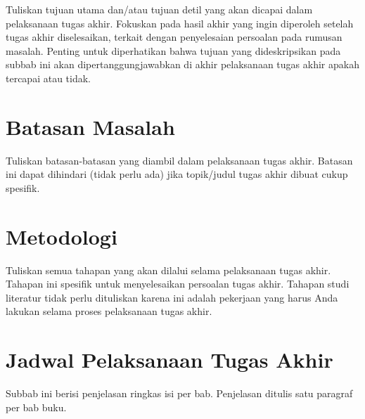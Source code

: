 Tuliskan tujuan utama dan/atau tujuan detil yang akan dicapai dalam pelaksanaan tugas akhir. Fokuskan pada hasil akhir yang ingin diperoleh setelah tugas akhir diselesaikan, terkait dengan penyelesaian persoalan pada rumusan masalah. Penting untuk diperhatikan bahwa tujuan yang dideskripsikan pada subbab ini akan dipertanggungjawabkan di akhir pelaksanaan tugas akhir apakah tercapai atau tidak.

\section{Batasan Masalah}

Tuliskan batasan-batasan yang diambil dalam pelaksanaan tugas akhir. Batasan ini dapat dihindari (tidak perlu ada) jika topik/judul tugas akhir dibuat cukup spesifik.

\section{Metodologi}

Tuliskan semua tahapan yang akan dilalui selama pelaksanaan tugas akhir. Tahapan ini spesifik untuk menyelesaikan persoalan tugas akhir. Tahapan studi literatur tidak perlu dituliskan karena ini adalah pekerjaan yang harus Anda lakukan selama proses pelaksanaan tugas akhir.

\section{Jadwal Pelaksanaan Tugas Akhir}

Subbab ini berisi penjelasan ringkas isi per bab. Penjelasan ditulis satu paragraf per bab buku.

